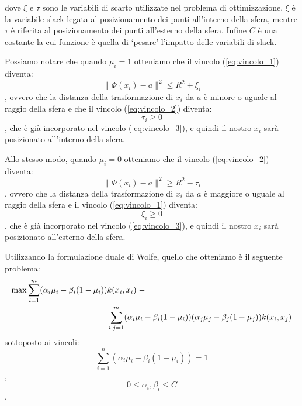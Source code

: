 \documentclass[a4paper,12pt]{report}
\begin{document}
\noindent dove $\xi$ e $\tau$ sono le variabili di scarto utilizzate nel problema di ottimizzazione. $\xi$ è la variabile slack legata al posizionamento dei punti all'interno della sfera, mentre $\tau$ è riferita al posizionamento dei punti all'esterno della sfera. Infine $C$ è una costante la cui funzione è quella di `pesare' l'impatto delle variabili di slack.

Possiamo notare che quando $\mu_i = 1$ otteniamo che il vincolo (\ref{eq:vincolo_1}) diventa:
\begin{equation*}
    \|\Phi(x_i)-a\|^{2} \le R^2 + \xi_i
\end{equation*},
ovvero che la distanza della trasformazione di $x_i$ da $a$ è minore o uguale al raggio della sfera e che il vincolo (\ref{eq:vincolo_2}) diventa:
\begin{equation*}
    \tau_i \ge 0
\end{equation*},
che è già incorporato nel vincolo (\ref{eq:vincolo_3}), e quindi il nostro $x_i$ sarà posizionato all'interno della sfera.

Allo stesso modo, quando $\mu_i = 0$ otteniamo che il vincolo (\ref{eq:vincolo_2}) diventa:
\begin{equation*}
    \|\Phi(x_i)-a\|^2 \ge R^2 - \tau_i
\end{equation*},
ovvero che la distanza della trasformazione di $x_i$ da $a$ è maggiore o uguale al raggio della sfera e il vincolo (\ref{eq:vincolo_1}) diventa:
\begin{equation*}
    \xi_i \ge 0
\end{equation*},
che è già incorporato nel vincolo (\ref{eq:vincolo_3}), e quindi il nostro $x_i$ sarà posizionato all'esterno della sfera.

Utilizzando la formulazione duale di Wolfe, quello che otteniamo è il seguente problema:
\begin{equation}
\begin{split}
    \max \displaystyle\sum_{i=1}^{m}(\alpha_i\mu_i - \beta_i(1-\mu_i))&k(x_i,x_i)\hspace{0,1cm}- \\ &\displaystyle\sum_{i,j=1}^{m}(\alpha_i\mu_i - \beta_i(1-\mu_i))(\alpha_j\mu_j - \beta_j(1-\mu_j))k(x_i,x_j)
\end{split}
\label{eq:problema_finale}
\end{equation}
sottoposto ai vincoli:
\begin{equation}
    \displaystyle\sum_{i=1}^{n}(\alpha_i\mu_i - \beta_i(1-\mu_i)) = 1
    \label{eq:v1_problema_finale}
\end{equation},
\begin{equation}
    0 \le \alpha_i,\beta_i \le C
    \label{eq:v2_problema_finale}
\end{equation},
\end{document}
